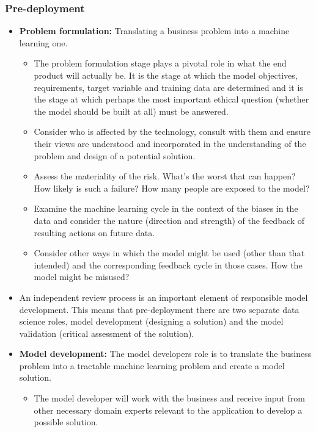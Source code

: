 \subsubsection*{Pre-deployment}

\begin{itemize}[leftmargin=*]
\item \textbf{Problem formulation:} Translating a business problem into a machine learning one.
%
\begin{itemize}[label=\hexagon]
%
\item The problem formulation stage plays a pivotal role in what the end product will actually be. It is the stage at which the model objectives, requirements, target variable and training data are determined and it is the stage at which perhaps the most important ethical question (whether the model should be built at all) must be answered.
%
\item Consider who is affected by the technology, consult with them and ensure their views are understood and incorporated in the understanding of the problem and design of a potential solution.
%
\item Assess the materiality of the risk. What’s the worst that can happen? How likely is such a failure? How many people are exposed to the model?
%
\item Examine the machine learning cycle in the context of the biases in the data and consider the nature (direction and strength) of the feedback of resulting actions on future data.
%
\item Consider other ways in which the model might be used (other than that intended) and the corresponding feedback cycle in those cases. How the model might be misused?
%
\end{itemize}
%
\item An independent review process is an important element of responsible model development. This means that pre-deployment there are two separate data science roles, model development (designing a solution) and the model validation (critical assessment of the solution).
%
\item \textbf{Model development:} The model developers role is to translate the business problem into a tractable machine learning problem and create a model solution.
%
\begin{itemize}[label=\hexagon]
%
\item The model developer will work with the business and receive input from other necessary domain experts relevant to the application to develop a possible solution.

\end{itemize}
\end{itemize}
